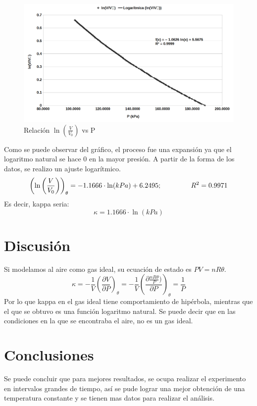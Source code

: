 \documentclass[12pt]{article}
\begin{document}
\begin{figure}[H]
	\centering
	\includegraphics[width=0.75\linewidth]{kappaObt}
	\caption{Relación $ \ln \left(\frac{V}{V_0} \right)$ vs P}
\end{figure}
Como se puede observar del gráfico, el proceso fue una expansión ya que el logaritmo natural se hace 0 en la mayor presión. A partir de la forma de los datos, se realizo un ajuste logarítmico.
\begin{equation}
\left(\ln \left(\frac{V}{V_0} \right) \right)_{\theta} = -1.1666\cdot\ln(kPa) + 6.2495; \hspace{1.5cm} R^2 = 0.9971
\end{equation}
Es decir, kappa seria:
$$\kappa = 1.1666 \cdot \ln(kPa) $$


\pagebreak


\section{Discusión}
Si modelamos al aire como gas ideal, su ecuación de estado es $PV=nR\theta$.
$$\kappa = -\frac{1}{V} \left( \frac{\partial V}{\partial P} \right) _{\theta} = -\frac{1}{V} \left( \frac{\partial \frac{nR\theta}{P})}{\partial P} \right) _{\theta} = \frac{1}{P}$$
Por lo que kappa en el gas ideal tiene comportamiento de hipérbola, mientras que el que se obtuvo es una función logaritmo natural. Se puede decir que en las condiciones en la que se encontraba el aire, no es un gas ideal.
\section{Conclusiones}
Se puede concluir que para mejores resultados, se ocupa realizar el experimento en intervalos grandes de tiempo, así se pude lograr una mejor obtención de una temperatura constante y se tienen mas datos para realizar el análisis.
\end{document}
